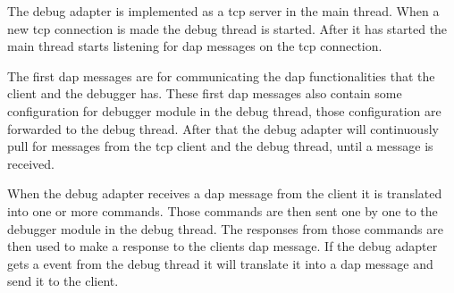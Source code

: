 
The debug adapter is implemented as a \gls{tcp} server in the main thread.
When a new \gls{tcp} connection is made the debug thread is started.
After it has started the main thread starts listening for \gls{dap} messages on the \gls{tcp} connection.


The first \gls{dap} messages are for communicating the \gls{dap} functionalities that the client and the debugger has.
These first \gls{dap} messages also contain some configuration for debugger module in the debug thread, those configuration are forwarded to the debug thread.
After that the debug adapter will continuously pull for messages from the \gls{tcp} client and the debug thread, until a message is received.


When the debug adapter receives a \gls{dap} message from the client it is translated into one or more commands.
Those commands are then sent one by one to the debugger module in the debug thread.
The responses from those commands are then used to make a response to the clients \gls{dap} message.
If the debug adapter gets a event from the debug thread it will translate it into a \gls{dap} message and send it to the client.





